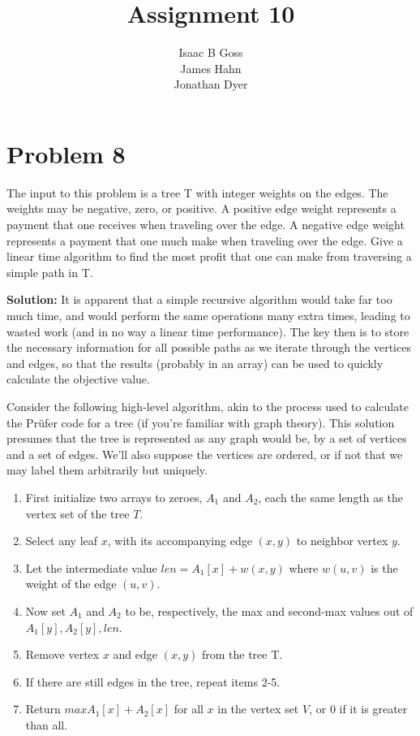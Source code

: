 \documentclass{article}
\author{Isaac B Goss\\ James Hahn\\ Jonathan Dyer}
\title{Assignment 10}
\providecommand{\prob}[1]{\section*{Problem #1}}
\providecommand{\soln}{\textbf{Solution: }}
\providecommand{\tightlist}{
    \setlength{\itemsep}{0pt}\setlength{\parskip}{0pt}
}
\begin{document}
\maketitle

\prob{8}
The input to this problem is a tree T with integer weights on the edges. The weights may be negative, zero, or positive. A positive edge weight represents a payment that one receives when traveling over the edge. A negative edge weight represents a payment that one much make when traveling over the edge. Give a linear time algorithm to find the most profit that one can make from traversing a simple path in T.

\soln
    It is apparent that a simple recursive algorithm would take far too much time, and would perform the same operations many extra times, leading to wasted work (and in no way a linear time performance). The key then is to store the necessary information for all possible paths as we iterate through the vertices and edges, so that the results (probably in an array) can be used to quickly calculate the objective value.
    
    Consider the following high-level algorithm, akin to the process used to calculate the Prüfer code for a tree (if you're familiar with graph theory). This solution presumes that the tree is represented as any graph would be, by a set of vertices and a set of edges. We'll also suppose the vertices are ordered, or if not that we may label them arbitrarily but uniquely.
    \begin{enumerate}\tightlist
        \item First initialize two arrays to zeroes, $A_1$ and $A_2$, each the same length as the vertex set of the tree $T$.
        \item Select any leaf $x$, with its accompanying edge $(x,y)$ to neighbor vertex $y$.
        \item Let the intermediate value $len = A_1[x] + w(x,y)$ where $w(u,v)$ is the weight of the edge $(u,v)$.
        \item Now set $A_1$ and $A_2$ to be, respectively, the max and second-max values out of ${A_1[y],A_2[y],len}$.
        \item Remove vertex $x$ and edge $(x,y)$ from the tree T.
        \item If there are still edges in the tree, repeat items 2-5.
        \item Return $max{A_1[x] + A_2[x]}$ for all $x$ in the vertex set $V$, or $0$ if it is greater than all.
    \end{enumerate}
    
\end{document}
